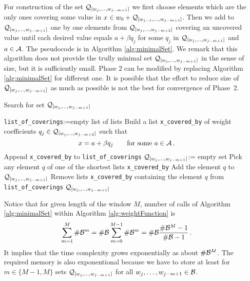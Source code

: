 For construction of the set $\mathcal{Q}_{[w_j,\dots, w_{j-m+1}]}$ we first choose elements which are the only ones covering some value in $x \in w_0 + \mathcal{Q}_{[w_{j-1},\dots, w_{j-m+1}]}$. Then we add to $\mathcal{Q}_{[w_j,\dots, w_{j-m+1}]}$ one by one elements from $\mathcal{Q}_{[w_j,\dots, w_{j-m+2}]}$ covering an uncovered value until each desired value equals $a+\beta q_j$ for some $q_j$ in $\mathcal{Q}_{[w_j,\dots, w_{j-m+1}]}$ and $a\in\mathcal{A}$. The pseudocode is in Algorithm \ref{alg:minimalSet}. We remark that this algorithm does not provide the trully minimal set $\mathcal{Q}_{[w_j,\dots, w_{j-m+1}]}$ in the sense of size, but it is sufficiently small. Phase 2 can be modified by replacing Algorithm \ref{alg:minimalSet} for different one. It is possible that the effort to reduce size of  $\mathcal{Q}_{[w_j,\dots, w_{j-m+1}]}$ as much as possible is not the best for convergence of Phase~2.
\begin{algorithm}
  \caption{Search for set $\mathcal{Q}_{[w_j,\dots, w_{j-m+1}]}$ }
    \label{alg:minimalSet}
  \begin{algorithmic}[1]
    \STATE \verb+list_of_coverings+:=empty list of lists
        \STATE Build a list \verb+x_covered_by+ of weight coefficients $q_j \in \mathcal{Q}_{[w_j,\dots, w_{j-m+2}]}$ such that 
        $$
        x=a+ \beta q_j \qquad\text{for some } a\in\mathcal{A}\,.
        $$ 
        \vspace{-20pt}
        \STATE Append \verb+x_covered_by+ to \verb+list_of_coverings+
    \ENDFOR
    \STATE $\mathcal{Q}_{[w_j,\dots, w_{j-m+1}]}$:= empty set
        \STATE Pick any element $q$ of one of the shortest lists \verb+x_covered_by+
        \STATE Add the element $q$ to $\mathcal{Q}_{[w_j,\dots, w_{j-m+1}]}$
        \STATE Remove lists \verb+x_covered_by+ containing the element $q$ from \verb+list_of_coverings+
    \ENDWHILE
    \RETURN $\mathcal{Q}_{[w_j,\dots, w_{j-m+1}]}$
  \end{algorithmic}
\end{algorithm}

Notice that for given length of the window $M$, number of calls of Algorithm \ref{alg:minimalSet} within Algorithm \ref{alg:weightFunction} is
$$
\sum_{m=1}^M  \#\mathcal{B}^m = \#\mathcal{B} \sum_{m=0}^{M-1}  \#\mathcal{B}^m = \#\mathcal{B} \frac{\#\mathcal{B}^M-1}{\#\mathcal{B}-1}\,.
$$    
It implies that the time complexity grows exponentially as about $\#\mathcal{B}^M$. The required memory is also exponentional because we have to store at least for $m\in\{M-1,M\}$ sets $\mathcal{Q}_{[w_j,\dots, w_{j-m+1}]}$ for all $w_j,\dots, w_{j-m+1} \in \mathcal{B}$.



















